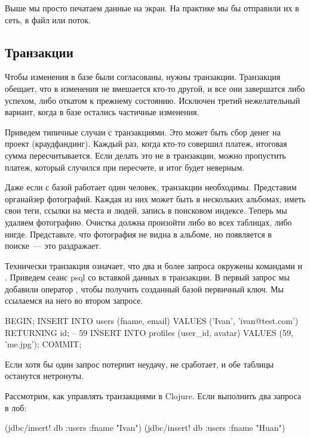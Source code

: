 Выше мы просто печатаем данные на экран. На практике мы бы отправили их в сеть, в файл или поток.

\subsection{Транзакции}

Чтобы изменения в базе были согласованы, нужны транзакции. Транзакция обещает, что в изменения не вмешается кто-то другой, и все они завершатся либо успехом, либо откатом к прежнему состоянию. Исключен третий нежелательный вариант, когда в базе остались частичные изменения.

Приведем типичные случаи с транзакциями. Это может быть сбор денег на проект (краудфандинг). Каждый раз, когда кто-то совершил платеж, итоговая сумма пересчитывается. Если делать это не в транзакции, можно пропустить платеж, который случился при пересчете, и итог будет неверным.

Даже если с базой работает один человек, транзакции необходимы. Представим органайзер фотографий. Каждая из них может быть в нескольких альбомах, иметь свои теги, ссылки на места и людей, запись в поисковом индексе. Теперь мы удаляем фотографию. Очистка должна произойти либо во всех таблицах, либо нигде. Представьте, что фотография не видна в альбоме, но появляется в поиске~--- это раздражает.

Технически транзакция означает, что два и более запроса окружены командами  и . Приведем сеанс psql со вставкой данных в транзакции. В первый запрос мы добавили оператор , чтобы получить созданный базой первичный ключ. Мы ссылаемся на него во втором запросе.

\begin{english}
  \begin{sql}
BEGIN;
INSERT INTO users (fname, email) VALUES ('Ivan', 'ivan@test.com') RETURNING id;
-- 59
INSERT INTO profiles (user_id, avatar) VALUES (59, 'me.jpg');
COMMIT;
  \end{sql}
\end{english}

Если хотя бы один запрос потерпит неудачу,  не сработает, и обе таблицы останутся нетронуты.

Рассмотрим, как управлять транзакциями в Clojure. Если выполнить два запроса в лоб:

\begin{english}
  \begin{clojure}
(jdbc/insert! db :users {:fname "Ivan"})
(jdbc/insert! db :users {:fname "Huan"})
  \end{clojure}
\end{english}

